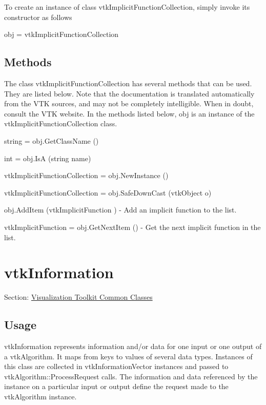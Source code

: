 To create an instance of class vtk\-Implicit\-Function\-Collection, simply invoke its constructor as follows \begin{DoxyVerb}  obj = vtkImplicitFunctionCollection
\end{DoxyVerb}
 \hypertarget{vtkwidgets_vtkxyplotwidget_Methods}{}\subsection{Methods}\label{vtkwidgets_vtkxyplotwidget_Methods}
The class vtk\-Implicit\-Function\-Collection has several methods that can be used. They are listed below. Note that the documentation is translated automatically from the V\-T\-K sources, and may not be completely intelligible. When in doubt, consult the V\-T\-K website. In the methods listed below, {\ttfamily obj} is an instance of the vtk\-Implicit\-Function\-Collection class. 
\begin{DoxyItemize}
\item {\ttfamily string = obj.\-Get\-Class\-Name ()}  
\item {\ttfamily int = obj.\-Is\-A (string name)}  
\item {\ttfamily vtk\-Implicit\-Function\-Collection = obj.\-New\-Instance ()}  
\item {\ttfamily vtk\-Implicit\-Function\-Collection = obj.\-Safe\-Down\-Cast (vtk\-Object o)}  
\item {\ttfamily obj.\-Add\-Item (vtk\-Implicit\-Function )} -\/ Add an implicit function to the list.  
\item {\ttfamily vtk\-Implicit\-Function = obj.\-Get\-Next\-Item ()} -\/ Get the next implicit function in the list.  
\end{DoxyItemize}\hypertarget{vtkcommon_vtkinformation}{}\section{vtk\-Information}\label{vtkcommon_vtkinformation}
Section\-: \hyperlink{sec_vtkcommon}{Visualization Toolkit Common Classes} \hypertarget{vtkwidgets_vtkxyplotwidget_Usage}{}\subsection{Usage}\label{vtkwidgets_vtkxyplotwidget_Usage}
vtk\-Information represents information and/or data for one input or one output of a vtk\-Algorithm. It maps from keys to values of several data types. Instances of this class are collected in vtk\-Information\-Vector instances and passed to vtk\-Algorithm\-::\-Process\-Request calls. The information and data referenced by the instance on a particular input or output define the request made to the vtk\-Algorithm instance.

